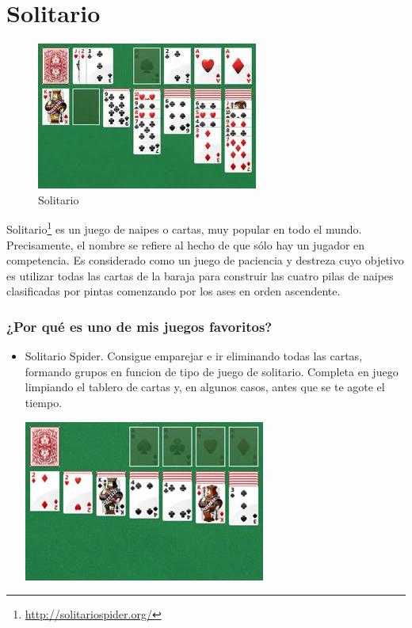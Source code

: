 \section{Solitario}

\begin{figure}[htbp]
\begin{center}
\includegraphics[width=.60\textwidth]{./imagenes/solitario.png}
\caption{Solitario}
\label{Solitario}
\end{center}
\end{figure}
Solitario\footnote{\url{http://solitariospider.org/}} es un juego de naipes o cartas, muy popular en todo el mundo. Precisamente, el nombre se refiere al hecho de que sólo hay un jugador en competencia. Es considerado como un juego de paciencia y destreza cuyo objetivo es utilizar todas las cartas de la baraja para construir las cuatro pilas de naipes clasificadas por pintas comenzando por los ases en orden ascendente.
\vfill

\subsubsection{¿Por qué es uno de mis juegos favoritos?}
\begin{itemize}
\item Solitario Spider. Consigue emparejar e ir eliminando todas las cartas, formando grupos en funcion de tipo de juego de solitario. Completa en juego limpiando el tablero de cartas y, en algunos casos, antes que se te agote el tiempo.
 
\begin{center}
\includegraphics[width=.60\textwidth]{./imagenes/solitario2.png}
\label{Solitario2}
\end{center}
\end{itemize}

